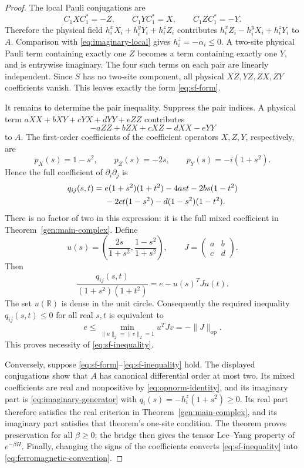 \documentclass[reqno]{amsart}
\theoremstyle{definition}
\theoremstyle{remark}
\newcommand{\R}{\mathbb R}
\begin{document}
\begin{proof}
The local Pauli conjugations are
\begin{equation}\label{eq:pauli-cayley}
 C_1XC_1^*=-Z,\qquad C_1YC_1^*=X,\qquad C_1ZC_1^*=-Y.
\end{equation}
Therefore the physical field
\(h_i^xX_i+h_i^yY_i+h_i^zZ_i\) contributes
\(h_i^xZ_i-h_i^yX_i+h_i^zY_i\) to \(A\).
Comparison with \eqref{eq:imaginary-local} gives
\(h_i^z=-\alpha_i\le0\).  A two-site physical Pauli term
containing exactly one \(Z\) becomes a term containing exactly one
\(Y\), and is entrywise imaginary.  The four such terms on each
pair are linearly independent.  Since \(S\) has no two-site
component, all physical \(XZ,YZ,ZX,ZY\) coefficients vanish.
This leaves exactly the form \eqref{eq:sf-form}.

It remains to determine the pair inequality.  Suppress the pair indices.
A physical term \(aXX+bXY+cYX+dYY+eZZ\) contributes
\[
 -aZZ+bZX+cXZ-dXX-eYY
\]
to \(A\).  The first-order coefficients of the coefficient operators
\(X,Z,Y\), respectively, are
\[
 p_X(s)=1-s^2,\qquad p_Z(s)=-2s,\qquad
 p_Y(s)=-i(1+s^2).
\]
Hence the full coefficient of \(\partial_i\partial_j\) is
\begin{align}
 q_{ij}(s,t)={}&e(1+s^2)(1+t^2)-4ast
       -2bs(1-t^2)\notag\\
       &-2ct(1-s^2)-d(1-s^2)(1-t^2).
 \label{eq:mixed-coefficient}
\end{align}
There is no factor of two in this expression: it is the full mixed
coefficient in Theorem~\ref{gen:main-complex}.
Define
\[
 u(s)=\left(\frac{2s}{1+s^2},\frac{1-s^2}{1+s^2}\right),
 \qquad J=\begin{pmatrix}a&b\\c&d\end{pmatrix}.
\]
Then
\begin{equation}\label{eq:opnorm-identity}
 \frac{q_{ij}(s,t)}{(1+s^2)(1+t^2)}=e-u(s)^TJu(t).
\end{equation}
The set \(u(\R)\) is dense in the unit circle.  Consequently
the required inequality \(q_{ij}(s,t)\le0\) for all real \(s,t\)
is equivalent to
\[
 e\le\min_{\|u\|_2=\|v\|_2=1}u^TJv=-\|J\|_{\mathrm{op}}.
\]
This proves necessity of \eqref{eq:sf-inequality}.

Conversely, suppose \eqref{eq:sf-form}--\eqref{eq:sf-inequality}
hold.  The displayed conjugations show that \(A\) has canonical
differential order at most two.  Its mixed coefficients are real and
nonpositive by \eqref{eq:opnorm-identity}, and its imaginary part is
\eqref{eq:imaginary-generator} with
\(q_i(s)=-h_i^z(1+s^2)\ge0\).  Its real part therefore satisfies
the real criterion in Theorem~\ref{gen:main-complex}, and its
imaginary part satisfies that theorem's one-site condition.  The
theorem proves preservation for all \(\beta\ge0\); the bridge
then gives the tensor Lee--Yang property of \(e^{-\beta H}\).
Finally, changing the signs of the coefficients converts
\eqref{eq:sf-inequality} into \eqref{eq:ferromagnetic-convention}.
\end{proof}
\end{document}
